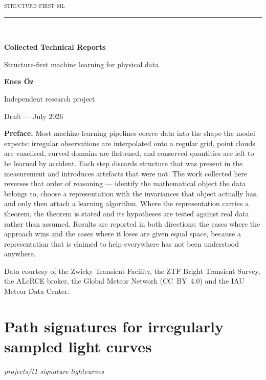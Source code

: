 \documentclass[11pt,a4paper]{report}
\begin{document}
\begin{titlepage}
\centering
\vspace*{2.2cm}
{\Large\scshape structure-first-ml}\\[0.6cm]
\rule{0.72\textwidth}{0.4pt}\\[0.8cm]
{\huge\bfseries Collected Technical Reports\par}
\vspace{0.9cm}
{\large Structure-first machine learning for physical data\par}
\vspace{1.6cm}
{\large\bfseries Enes \"Oz\par}
\vspace{0.4cm}
{\normalsize Independent research project\par}
\vspace{0.3cm}
{\normalsize Draft --- July 2026\par}
\vspace{2.0cm}
\begin{minipage}{0.82\textwidth}
\small
\noindent\textbf{Preface.} Most machine-learning pipelines coerce data into the shape the
model expects: irregular observations are interpolated onto a regular grid, point clouds are
voxelised, curved domains are flattened, and conserved quantities are left to be learned by
accident. Each step discards structure that was present in the measurement and introduces
artefacts that were not. The work collected here reverses that order of reasoning ---
identify the mathematical object the data belongs to, choose a representation with the
invariances that object actually has, and only then attach a learning algorithm. Where the
representation carries a theorem, the theorem is stated and its hypotheses are tested against
real data rather than assumed. Results are reported in both directions: the cases where the
approach wins and the cases where it loses are given equal space, because a representation
that is claimed to help everywhere has not been understood anywhere.
\end{minipage}
\vfill
{\small Data courtesy of the Zwicky Transient Facility, the ZTF Bright Transient Survey, the
ALeRCE broker, the Global Meteor Network (CC~BY~4.0) and the IAU Meteor Data Center.\par}
\end{titlepage}

\tableofcontents
\clearpage

\chapter{Path signatures for irregularly sampled light curves}
\label{ch:t1}
\noindent\textit{projects/t1-signature-lightcurves}
\end{document}

